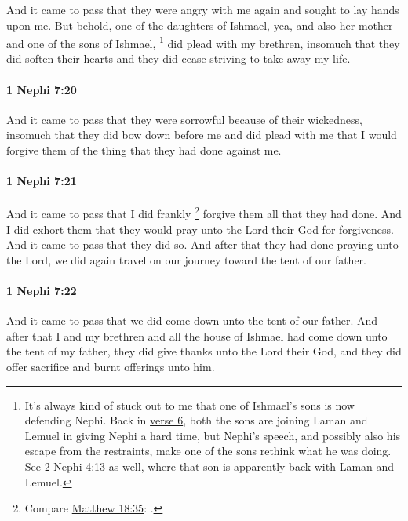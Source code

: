 			And it came to pass that they were angry with me again
			and sought to lay hands upon me.
			But behold, one of the daughters of Ishmael,
			yea, and also her mother and one of the sons of Ishmael,%
				\footnote{%
					\label{1NEPHI-7-19-NOTE-sons}%
					It's always kind of stuck out to me that one of Ishmael's sons is now defending Nephi. Back in \hyperref[1NEPHI-7-6]{verse 6}, both the sons are joining Laman and Lemuel in giving Nephi a hard time, but Nephi's speech, and possibly also his escape from the restraints, make one of the sons rethink what he was doing. See \hyperref[2NEPHI-4-13]{2 Nephi 4:13} as well, where that son is apparently back with Laman and Lemuel.
					}
			did plead with my brethren,
			insomuch that they did soften their hearts
			and they did cease striving to take away my life.

		\paragraph{1 Nephi 7:20} %
			\label{1NEPHI-7-20}

			And it came to pass that they were sorrowful because of their wickedness,
			insomuch that they did bow down before me
			and did plead with me that I would forgive them of the thing
			that they had done against me.

		\paragraph{1 Nephi 7:21} %
			\label{1NEPHI-7-21}

			And it came to pass that I did frankly%
				\footnote{%
					Compare \hyperref[MATTHEW-18-35]{Matthew 18:35}: .
					}
			forgive them all that they had done.
			And I did exhort them that they would pray
			unto the Lord their God for forgiveness.
			And it came to pass that they did so.
			And after that they had done praying unto the Lord,
			we did again travel on our journey toward the tent of our father.

		\paragraph{1 Nephi 7:22} %
			\label{1NEPHI-7-22}

			And it came to pass that we did come down unto the tent of our father.
			And after that I and my brethren and all the house of Ishmael
			had come down unto the tent of my father,
			they did give thanks unto the Lord their God,
			and they did offer sacrifice and burnt offerings unto him.

